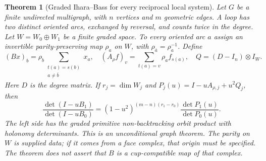 \documentclass[11pt,a4paper]{article}
\newtheorem{theorem}[definition]{Theorem}
\theoremstyle{remark}\newtheorem{remark}[definition]{Remark}
\begin{document}
\begin{theorem}[Graded Ihara--Bass for every reciprocal local system]\label{thm:bass}
Let $G$ be a finite undirected multigraph, with $n$ vertices and $m$ geometric edges. A loop has two distinct oriented arcs, exchanged by reversal, and counts twice in the degree. Let $W=W_0\oplus W_1$ be a finite graded space. To every oriented arc $a$ assign an invertible parity-preserving map $\rho_a$ on $W$, with $\rho_{\bar a}=\rho_a^{-1}$. Define
\[
(Bx)_b=\rho_b\sum_{\substack{t(a)=s(b)\\a\ne\bar b}}x_a,
\quad (A_\rho f)_v=\sum_{t(a)=v}\rho_af_{s(a)},
\quad Q=(D-I_n)\otimes I_W.
\]
Here $D$ is the degree matrix. If $r_j=\dim W_j$ and
$P_j(u)=I-uA_{\rho,j}+u^2Q_j$, then
\[
\boxed{\frac{\det(I-uB_1)}{\det(I-uB_0)}
=(1-u^2)^{(m-n)(r_1-r_0)}\frac{\det P_1(u)}{\det P_0(u)}.}
\tag{4.2}\label{eq:bass}
\]
The left side has the graded primitive non-backtracking orbit product with holonomy determinants. This is an unconditional graph theorem. The parity on $W$ is supplied data; if it comes from a face complex, that origin must be specified. The theorem does not assert that $B$ is a cup-compatible map of that complex.
\end{theorem}
\end{document}
